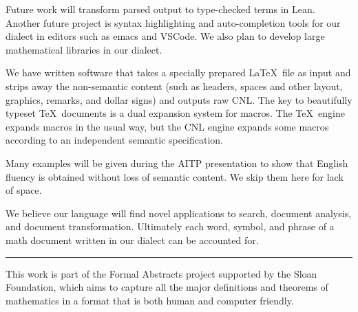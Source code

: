 \documentclass{easychair}
\renewcommand{\~}{\ }
\renewcommand{\_}{\textunderscore}
\begin{document}
Future work will transform parsed output to type-checked
terms in Lean.  Another future project is syntax highlighting and auto-completion tools 
for our
dialect in editors such as emacs and VSCode. We also plan to develop large
mathematical libraries in our dialect.

We have written software that takes a specially prepared
\LaTeX\ file as input and strips away the non-semantic content  
(such as headers, spaces and other layout, graphics,
remarks, and dollar signs) and
outputs raw CNL.
The key to beautifully typeset \TeX\ documents is a
dual expansion system for macros.  The \TeX\ engine expands macros in
the usual way, but the CNL engine expands some macros according to an
independent semantic specification.   

Many examples will be given during the AITP presentation to show that English
fluency is obtained without loss of semantic content.  We skip them here for lack of space.

We believe our language will find novel applications to search, document
analysis, and document transformation.  
Ultimately each word, symbol, and phrase of a math document written in our dialect can be 
accounted for. 

\bigskip
\noindent\rule{2cm}{0.4pt}


This work is part of the Formal Abstracts project supported by the Sloan Foundation, 
which aims to capture all the major
definitions and theorems of mathematics in a format that is both human and computer
friendly.
\end{document}
